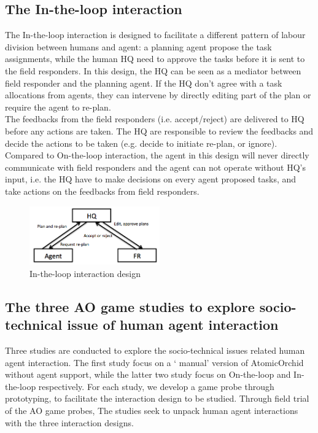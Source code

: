 \subsection{The In-the-loop interaction}
The In-the-loop interaction is designed to facilitate a different pattern of labour division between humans and agent: a planning agent propose the task assignments, while the human HQ need to approve the tasks before it is sent to the field responders. In this design, the HQ can be seen as a mediator between field responder and the planning agent. If the HQ don't agree with a task allocations from agents, they can intervene by directly editing part of the plan or require the agent to re-plan. \\

The feedbacks from the field responders (i.e. accept/reject) are delivered to HQ before any actions are taken. The HQ are responsible to review the feedbacks and decide the actions to be taken (e.g. decide to initiate re-plan, or ignore). Compared to On-the-loop interaction, the agent in this design will never directly communicate with field responders and the agent can not operate without HQ's input, i.e. the HQ have to make decisions on every agent proposed tasks, and take actions on the feedbacks from field responders. \\

\begin{figure}[h]
  \centering
  \includegraphics[width=0.5\textwidth]{img/approach/InTheLoop}
  \caption{In-the-loop interaction design}
  \label{fig:OnTheLoop}
\end{figure}


\subsection{The three AO game studies to explore socio-technical issue of human agent interaction}
Three studies are conducted to explore the socio-technical issues related human agent interaction. The first study focus on a ` manual' version of AtomicOrchid without agent support, while the latter two study focus on On-the-loop and In-the-loop respectively. For each study, we develop a game probe through prototyping, to facilitate the interaction design to be studied. Through field trial of the AO game probes, The studies seek to unpack human agent interactions with the three interaction designs. \\ 

